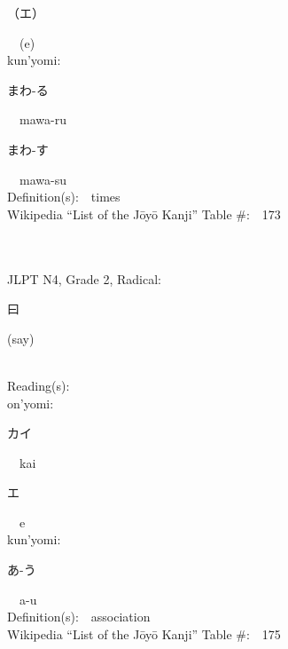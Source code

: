 \begin{multicols}{2}
{\hspace*{2em}}{\begin{CJK}{UTF8}{min} （エ） \end{CJK}}\ \ (e)\ \ \\
{\hspace*{1em}}kun'yomi:\ \ \\
{\hspace*{2em}}{\begin{CJK}{UTF8}{min} まわ-る \end{CJK}}\ \ mawa-ru\ \ \\
{\hspace*{2em}}{\begin{CJK}{UTF8}{min} まわ-す \end{CJK}}\ \ mawa-su\ \ \\
Definition(s):\ \ times \\
Wikipedia ``List of the J\=oy\=o Kanji'' Table \#:\ \ 173 \\
\ \ \\
{\fontsize{34pt}{40pt}  }\ \ \\  %
{JLPT N4, Grade 2, Radical:\ \ {\begin{CJK}{UTF8}{min} 曰 \end{CJK}} (say) } \\
Reading(s):\ \ \\
{\hspace*{1em}}on'yomi:\ \ \\
{\hspace*{2em}}{\begin{CJK}{UTF8}{min} カイ \end{CJK}}\ \ kai\ \ \\
{\hspace*{2em}}{\begin{CJK}{UTF8}{min} エ \end{CJK}}\ \ e\ \ \\
{\hspace*{1em}}kun'yomi:\ \ \\
{\hspace*{2em}}{\begin{CJK}{UTF8}{min} あ-う \end{CJK}}\ \ a-u\ \ \\
Definition(s):\ \ association \\
Wikipedia ``List of the J\=oy\=o Kanji'' Table \#:\ \ 175 \\

\end{multicols}
